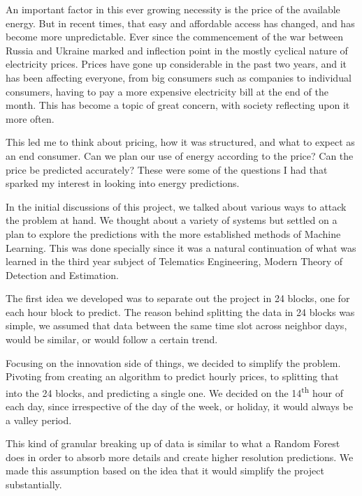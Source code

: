 \documentclass[12pt]{report} %
\begin{document}
An important factor in this ever growing necessity is the price of the available energy. But in recent times, that easy and affordable access has changed, and has become more unpredictable. Ever since the commencement of the war between Russia and Ukraine marked and inflection point in the mostly cyclical nature of electricity prices. Prices have gone up considerable in the past two years, and it has been affecting everyone, from big consumers such as companies to individual consumers, having to pay a more expensive electricity bill at the end of the month. This has become a topic of great concern, with society reflecting upon it more often.

This led me to think about pricing, how it was structured, and what to expect as an end consumer. Can we plan our use of energy according to the price? Can the price be predicted accurately? These were some of the questions I had that sparked my interest in looking into energy predictions.



In the initial discussions of this project, we talked about various ways to attack the problem at hand.
We thought about a variety of systems but settled on a plan to explore the predictions with the more established methods of Machine Learning.
This was done specially since it was a natural continuation of what was learned in the third year subject of Telematics Engineering, Modern Theory of Detection and Estimation.

The first idea we developed was to separate out the project in 24 blocks, one for each hour block to predict.
The reason behind splitting the data in 24 blocks was simple, we assumed that data between the same time slot across neighbor days, would be similar, or would follow a certain trend.

Focusing on the innovation side of things, we decided to simplify the problem.
Pivoting from creating an algorithm to predict hourly prices, to splitting that into the 24 blocks, and predicting a single one.
We decided on the 14\textsuperscript{th} hour of each day, since irrespective of the day of the week, or holiday, it would always be a valley period.

This kind of granular breaking up of data is similar to what a Random Forest does in order to absorb more details and create higher resolution predictions. We made this assumption based on the idea that it would simplify the project substantially.
\end{document}
